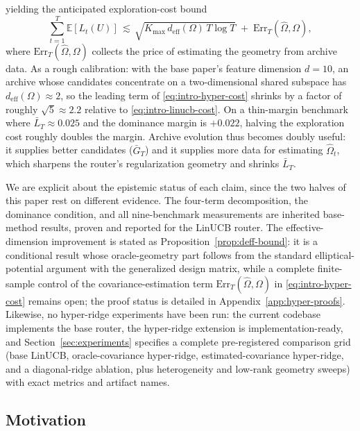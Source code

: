 \documentclass{article} %
\providecommand{\E}{\mathbb{E}}
\begin{document}
yielding the anticipated exploration-cost bound
\begin{equation}
\label{eq:intro-hyper-cost}
\sum_{t=1}^{T}\E[L_t(U)]
\,\lesssim\,
\sqrt{K_{\max}\, d_{\mathrm{eff}}(\Omega)\, T \log T}
\;+\;
\mathrm{Err}_T(\widehat\Omega, \Omega),
\end{equation}
where $\mathrm{Err}_T(\widehat\Omega,\Omega)$ collects the price of estimating the geometry from archive data. As a rough calibration: with the base paper's feature dimension $d = 10$, an archive whose candidates concentrate on a two-dimensional shared subspace has $d_{\mathrm{eff}}(\Omega) \approx 2$, so the leading term of \eqref{eq:intro-hyper-cost} shrinks by a factor of roughly $\sqrt{5} \approx 2.2$ relative to \eqref{eq:intro-linucb-cost}. On a thin-margin benchmark where $\bar L_T \approx 0.025$ and the dominance margin is $+0.022$, halving the exploration cost roughly doubles the margin. Archive evolution thus becomes doubly useful: it supplies better candidates ($\bar G_T$) and it supplies more data for estimating $\widehat\Omega_t$, which sharpens the router's regularization geometry and shrinks $\bar L_T$.

We are explicit about the epistemic status of each claim, since the two halves of this paper rest on different evidence. The four-term decomposition, the dominance condition, and all nine-benchmark measurements are inherited base-method results, proven and reported for the LinUCB router. The effective-dimension improvement is stated as Proposition~\ref{prop:deff-bound}: it is a conditional result whose oracle-geometry part follows from the standard elliptical-potential argument with the generalized design matrix, while a complete finite-sample control of the covariance-estimation term $\mathrm{Err}_T(\widehat\Omega,\Omega)$ in \eqref{eq:intro-hyper-cost} remains open; the proof status is detailed in Appendix~\ref{app:hyper-proofs}. Likewise, no hyper-ridge experiments have been run: the current codebase implements the base router, the hyper-ridge extension is implementation-ready, and Section~\ref{sec:experiments} specifies a complete pre-registered comparison grid (base LinUCB, oracle-covariance hyper-ridge, estimated-covariance hyper-ridge, and a diagonal-ridge ablation, plus heterogeneity and low-rank geometry sweeps) with exact metrics and artifact names.

\subsection{Motivation}
\end{document}
